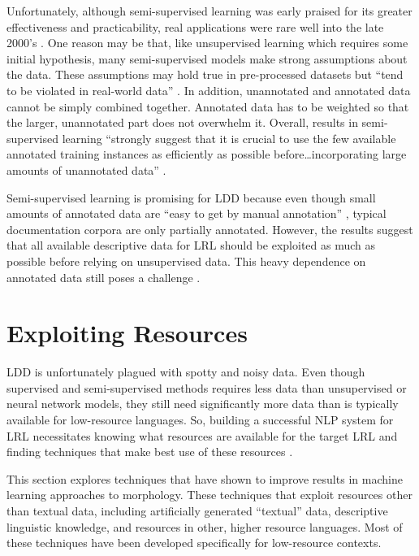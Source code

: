 \documentclass[12pt]{article}
\begin{document}
Unfortunately, although semi-supervised learning was early praised for its greater effectiveness and practicability, real applications were rare well into the late 2000’s \cite{druck_reducing_2007}. One reason may be that, like unsupervised learning which requires some initial hypothesis, many semi-supervised models make strong assumptions about the data. These assumptions may hold true in pre-processed datasets but ``tend to be violated in real-world data'' \cite[p. 1]{druck_reducing_2007}. In addition, unannotated and annotated data cannot be simply combined together. Annotated data has to be weighted so that the larger, unannotated part does not overwhelm it. Overall, results in semi-supervised learning ``strongly suggest that it is crucial to use the few available annotated training instances as efficiently as possible before…incorporating large amounts of unannotated data'' \cite[p. 35]{ruokolainen_supervised_2013}. 

Semi-supervised learning is promising for LDD because even though small amounts of annotated data are ``easy to get by manual annotation'' \cite[p. 49]{virpioja_empirical_2011}, typical documentation corpora are only partially annotated. However, the results suggest that all available descriptive data for LRL should be exploited as much as possible before relying on unsupervised data. This heavy dependence on annotated data still poses a challenge \cite{andrews_bayesian_2017}. 

\section{Exploiting Resources}
\label{resources}

LDD is unfortunately plagued with spotty and noisy data. Even though supervised and semi-supervised methods requires less data than unsupervised or neural network models, they still need significantly more data than is typically available for low-resource languages. So, building a successful NLP system for LRL necessitates knowing what resources are available for the target LRL \cite{duong_natural_2017} and finding techniques that make best use of these resources \cite{palmer_semi-automated_2009}. 

This section explores techniques that have shown to improve results in machine learning approaches to morphology. These techniques that exploit resources other than textual data, including artificially generated ``textual'' data, descriptive linguistic knowledge, and resources in other, higher resource languages. Most of these techniques have been developed specifically for low-resource contexts. 
\end{document}
